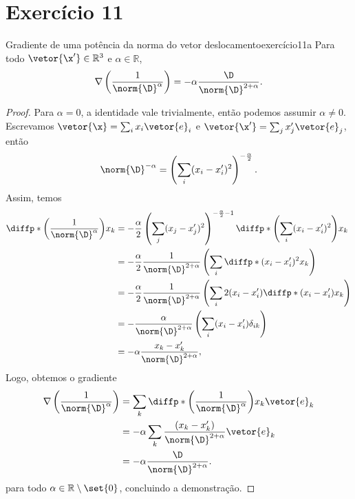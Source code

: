 \section*{Exercício 11}
\begin{lemma}{Gradiente de uma potência da norma do vetor deslocamento}{exercício11a}
    Para todo \(\vetor{\x'} \in \mathbb{R}^3\) e \(\alpha \in \mathbb{R}\),
    \begin{equation*}
        \nabla\left(\frac1{\norm{\D}^\alpha}\right) = - \alpha \frac{\D}{\norm{\D}^{2 + \alpha}}.
    \end{equation*}
\end{lemma}
\begin{proof}
    Para \(\alpha = 0\), a identidade vale trivialmente, então podemos assumir \(\alpha \neq 0\). Escrevamos \(\vetor{\x} = \sum_i x_i \vetor{e}_i\) e \(\vetor{\x'} = \sum_j x_j' \vetor{e}_j\), então
    \begin{equation*}
        \norm{\D}^{-\alpha} = \left(\sum_{i} (x_i - x_i')^2\right)^{-\frac{\alpha}{2}}.
    \end{equation*}
    Assim, temos
    \begin{align*}
        \diffp*{\left(\frac1{\norm{\D}^{\alpha}}\right)}{x_k}
        &= - \frac{\alpha}{2} \left(\sum_j (x_j - x_j')^2\right)^{-\frac{\alpha}{2}-1} \diffp*{\left(\sum_i (x_i - x'_i)^2\right)}{x_k}\\
        &= - \frac{\alpha}{2} \frac{1}{\norm{\D}^{2 + \alpha}} \left(\sum_i\diffp*{(x_i - x'_i)^2}{x_k}\right)\\
        &= - \frac{\alpha}{2} \frac{1}{\norm{\D}^{2 + \alpha}} \left(\sum_i 2(x_i - x'_i)\diffp*{(x_i - x'_i)}{x_k}\right)\\
        &= -  \frac{\alpha}{\norm{\D}^{2 + \alpha}} \left(\sum_i (x_i - x'_i)\delta_{ik}\right)\\
        &= - \alpha \frac{x_k - x'_k}{\norm{\D}^{2 + \alpha}},
    \end{align*}
    Logo, obtemos o gradiente
    \begin{align*}
        \nabla\left(\frac{1}{\norm{\D}^\alpha}\right)
        &= \sum_{k} \diffp*{\left(\frac1{\norm{\D}^{\alpha}}\right)}{x_k} \vetor{e}_k\\
        &= -\alpha\sum_k{\frac{(x_k - x_k')}{\norm{\D}^{2 + \alpha}}}\vetor{e}_k\\
        &= -\alpha \frac{\D}{\norm{\D}^{2 + \alpha}}.
    \end{align*}
    para todo \(\alpha \in \mathbb{R}\setminus\set{0}\), concluindo a demonstração.
\end{proof}


